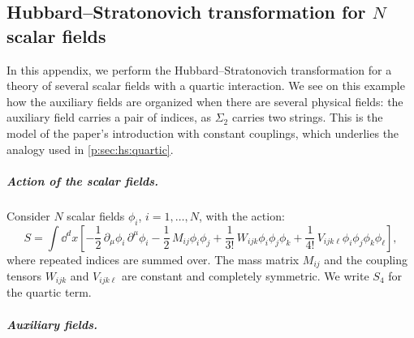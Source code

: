 \subsection{Hubbard--Stratonovich transformation for \texorpdfstring{$N$}{N} scalar fields}
\label{p:app:scalar-hs}


In this appendix, we perform the Hubbard--Stratonovich transformation for a theory of several scalar fields with a quartic interaction.
We see on this example how the auxiliary fields are organized when there are several physical fields: the auxiliary field carries a pair of indices, as $\Sigma_2$ carries two strings.
This is the model of the paper's introduction with constant couplings, which underlies the analogy used in \cref{p:sec:hs:quartic}.


\subparagraph{Action of the scalar fields.}

Consider $N$ scalar fields $\phi_i$, $i = 1, \ldots, N$, with the action:
\begin{equation}
\label{p:eq:shs:action}
S
  = \int \dd^d x \left[
    - \frac{1}{2} \, \partial_\mu \phi_i \, \partial^\mu \phi_i
    - \frac{1}{2} \, M_{ij} \phi_i \phi_j
    + \frac{1}{3!} \, W_{ijk} \phi_i \phi_j \phi_k
    + \frac{1}{4!} \, V_{ijk\ell} \phi_i \phi_j \phi_k \phi_\ell
  \right],
\end{equation}
where repeated indices are summed over.
The mass matrix $M_{ij}$ and the coupling tensors $W_{ijk}$ and $V_{ijk\ell}$ are constant and completely symmetric.
We write $S_4$ for the quartic term.


\subparagraph{Auxiliary fields.}

